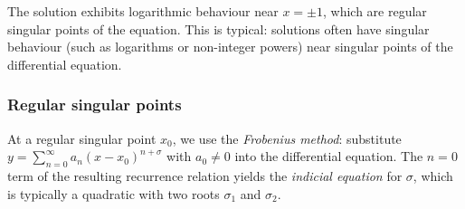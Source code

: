 \documentclass[a4paper]{article}
\begin{document}
\begin{remark}
  The solution exhibits logarithmic behaviour near $x = \pm 1$, which are regular singular points of the equation. This is typical: solutions often have singular behaviour (such as logarithms or non-integer powers) near singular points of the differential equation.
\end{remark}

\subsubsection{Regular singular points}
\begin{remark}
  At a regular singular point $x_0$, we use the \emph{Frobenius method}: substitute $y = \sum_{n=0}^{\infty} a_n (x - x_0)^{n + \sigma}$ with $a_0 \neq 0$ into the differential equation. The $n = 0$ term of the resulting recurrence relation yields the \emph{indicial equation} for $\sigma$, which is typically a quadratic with two roots $\sigma_1$ and $\sigma_2$.
\end{remark}
\end{document}
